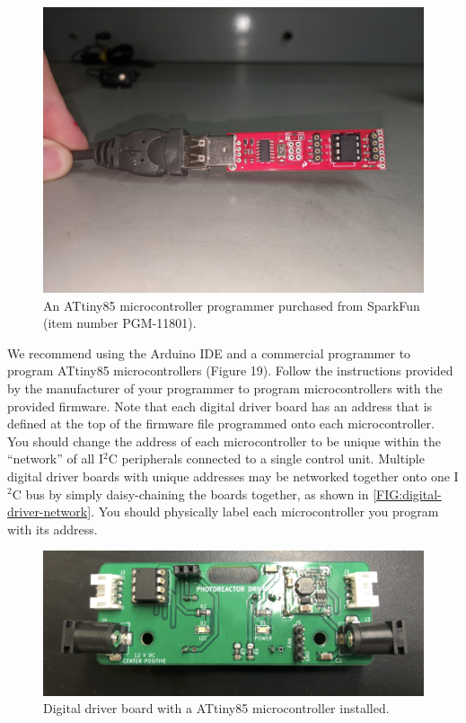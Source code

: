 \documentclass[11pt]{article}
\begin{document}
\begin{figure}[H]
	\centering
	\includegraphics[width=\textwidth/2]{"./tiny-programmer.jpg"}
	\caption{An ATtiny85 microcontroller programmer purchased from SparkFun (item number PGM-11801).}
\end{figure}

\clearpage

We recommend using the Arduino IDE and a commercial programmer to program ATtiny85 microcontrollers (Figure 19).
Follow the instructions provided by the manufacturer of your programmer to program microcontrollers with the provided firmware.
Note that each digital driver board has an address that is defined at the top of the firmware file programmed onto each microcontroller.
You should change the address of each microcontroller to be unique within the ``network'' of all I$^2$C peripherals connected to a single control unit.
Multiple digital driver boards with unique addresses may be networked together onto one I$^2$C bus by simply daisy-chaining the boards together, as shown in \autoref{FIG:digital-driver-network}.
You should physically label each microcontroller you program with its address.

\begin{figure}[H]
	\centering
	\includegraphics[width=\textwidth/2]{"./fig20.png"}
	\caption{Digital driver board with a ATtiny85 microcontroller installed.}
\end{figure}
\end{document}
